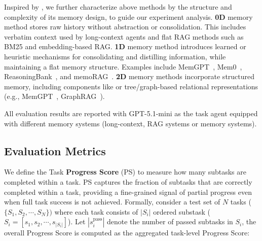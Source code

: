 Inspired by \citet{hu2025memory}, we further characterize above methods by the structure and  complexity of its memory design, to guide our experiment analysis. 
\textbf{0D} memory method stores raw history without abstraction or consolidation. This includes verbatim context used by long-context agents and flat RAG methods such as BM25 and embedding-based RAG. 
\textbf{1D} memory method introduces learned or heuristic mechanisms for consolidating and distilling information, while maintaining a flat memory structure. Examples include MemGPT~\citep{packer2023memgpt}, Mem0~\citep{mem0}, ReasoningBank~\citep{ouyang2025reasoningbank}, and memoRAG~\citep{qian2025memorag}.
\textbf{2D} memory methods incorporate structured memory, including components like or tree/graph-based relational representations (e.g., MemGPT~\citep{packer2023memgpt}, GraphRAG~\citep{edge2024local}).

All evaluation results are reported with GPT-5.1-mini as the task agent equipped with different memory systems (long-context, RAG systems or memory systems). 

\subsection{Evaluation Metrics}
\label{sec:eval_metric}




We define the Task \textbf{Progress Score} (PS) to measure how many subtasks are completed within a task. PS captures the fraction of subtasks that are correctly completed within a task, providing a fine-grained signal of partial progress even when full task success is not achieved. Formally, consider a test set of $N$ tasks ($\{S_1, S_2, \cdots, S_N\})$ where each task consists of $|S_i|$ ordered substask ($S_i = [s_1, s_2, \cdots, s_{|S_i|}]$). Let $|s_i^\text{pass}|$ denote the number of passed subtasks in $S_i$, the overall Progress Score is computed as the aggregated task-level Progress Score: 

